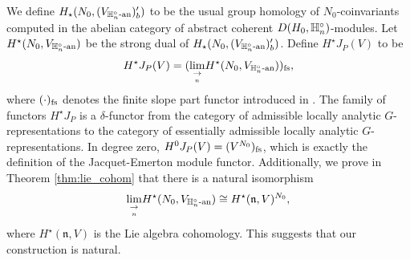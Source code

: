 \documentclass[10pt]{amsart}
\begin{document}
We define $H_{\star}(N_{0},(V_{\mathbb{H}_{n}^{\circ}\textnormal{-an}})^{\prime}_{b})$ to be the usual group homology of $N_{0}$-coinvariants computed in the abelian category of abstract coherent $D(H_{0},\mathbb{H}_{n}^{\circ})$-modules. Let $H^{\star}(N_{0},V_{\mathbb{H}_{n}^{\circ}\textnormal{-an}})$ be the strong dual of $H_{\star}(N_{0},(V_{\mathbb{H}_{n}^{\circ}\textnormal{-an}})^{\prime}_{b})$. Define $H^{\star}J_{P}(V)$ to be \begin{equation*}
    H^{\star}J_{P}(V)= (\underset{\underset{n}{\rightarrow}}{\lim} H^{\star}(N_{0},V_{\mathbb{H}_{n}^{\circ}\textnormal{-an}}))_{\textnormal{fs}},
\end{equation*}
where $(\cdot)_{\textnormal{fs}}$ denotes the finite slope part functor introduced in \cite{Jacquet1}. The family of functors $H^{\star}J_{P}$ is a $\delta$-functor from the category of admissible locally analytic $G$-representations to the category of essentially admissible locally analytic $G$-representations. In degree zero, $H^{0}J_{P}(V)= (V^{N_{0}})_{\textnormal{fs}}$, which is exactly the definition of the Jacquet-Emerton module functor. Additionally, we prove in Theorem \ref{thm:lie_cohom} that there is a natural isomorphism \begin{equation}\label{eq:intro_lim_n_cohom}
    \underset{\underset{n}{\rightarrow}}{\lim} H^{\star}(N_{0},V_{\mathbb{H}_{n}^{\circ}\textnormal{-an}}) \cong H^{\star}(\mathfrak{n},V)^{N_{0}},
\end{equation} where $H^{\star}(\mathfrak{n},V)$ is the Lie algebra cohomology. This suggests that our construction is natural. 
\end{document}
